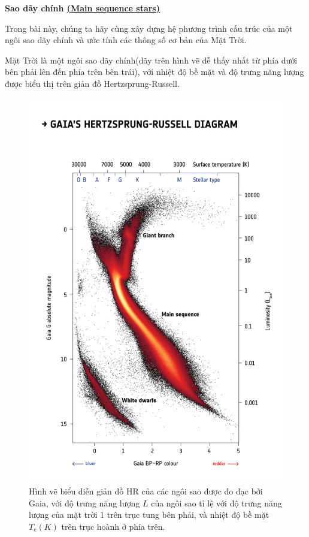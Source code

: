 \textbf{ \large  Sao dãy chính \href{https://www.wikiwand.com/en/Main_sequence}{(Main sequence stars)}}

Trong bài này, chúng ta hãy cùng xây dựng hệ phương trình cấu trúc của một ngôi sao dãy chính và ước tính các thông số cơ bản của Mặt Trời.

Mặt Trời là một ngôi sao dãy chính(dãy trên hình vẽ dễ thấy nhất từ phía dưới bên phải lên đến phía trên bên trái), với nhiệt độ bề mặt và độ trưng năng lượng được biểu thị trên giản đồ Hertzsprung-Russell.
\begin{figure}[h!]
    \centering
\includegraphics[height=0.65\textheight]{Problem_12/hinh1.jpg}
    \caption{Hình vẽ biểu diễn giản đồ HR của các ngôi sao được đo đạc bởi Gaia, với độ trưng năng lượng $L$ của ngôi sao tỉ lệ với độ trưng năng lượng của mặt trời 1 trên trục tung bên phải, và nhiệt độ bề mặt $T_e(\si{K})$  trên trục hoành ở phía trên.}
\end{figure}
\newpage

